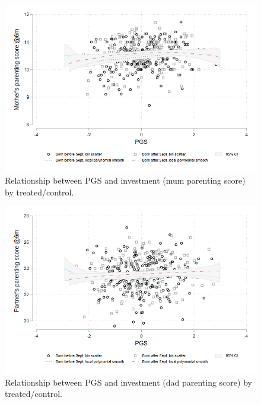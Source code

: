 \documentclass{article}
\begin{document}
\begin{figure}[H]
\centering 
\includegraphics[width=1\linewidth]{../figures/PGSxTreat_mumpar.png}
\caption{Relationship between PGS and investment (mum parenting score) by treated/control.}
\label{fig:PGSxTreat_mumpar}
\end{figure}

\begin{figure}[H]
\centering 
\includegraphics[width=1\linewidth]{../figures/PGSxTreat_dadpar.png}
\caption{Relationship between PGS and investment (dad parenting score) by treated/control.}
\label{fig:PGSxTreat_dadpar}
\end{figure}
\end{document}
